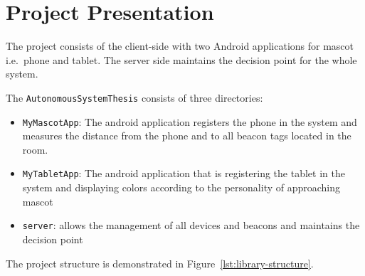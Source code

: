 \section{Project Presentation}
\label{sec:project-presentation}
The project consists of the client-side with two Android applications for mascot i.e.\ phone and tablet.
The server side maintains the decision point for the whole system.

The \texttt{AutonomousSystemThesis} consists of three directories:

\begin{itemize}
    \item \texttt{MyMascotApp}: The android application registers the phone in the system and measures the distance
    from the phone and to all beacon tags located in the room.
    \item \texttt{MyTabletApp}: The android application that is registering the tablet in the system and displaying colors according to the personality of approaching mascot
    \item \texttt{server}: allows the management of all devices and beacons and maintains the decision point
\end{itemize}

The project structure is demonstrated in Figure~\ref{lst:library-structure}.

